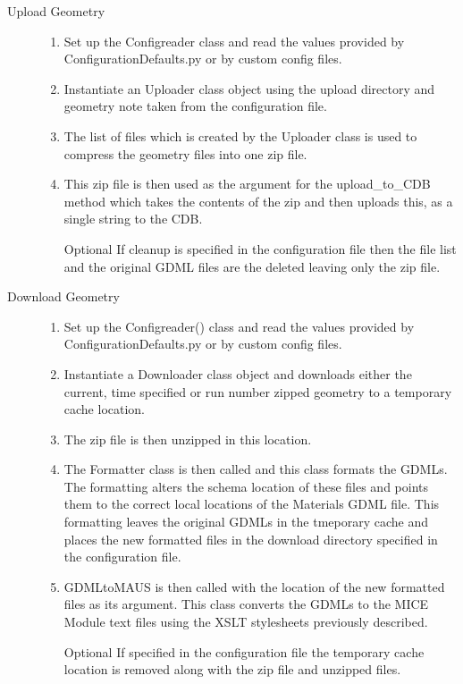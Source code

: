 \begin{description}
  \item[Upload Geometry] \hfill 
  \begin{enumerate}
   \item Set up the Configreader class and read the values provided by ConfigurationDefaults.py or by custom config files.
   \item Instantiate an Uploader class object using the upload directory and geometry note taken from the configuration file.
   \item The list of files which is created by the Uploader class is used to compress the geometry files into one zip file.
   \item This zip file is then used as the argument for the upload\_to\_CDB method which takes the contents of the zip and then uploads this, as a
single string to the CDB.
   \item[Optional] If cleanup is specified in the configuration file then the file list and the original GDML files are the deleted leaving only the
zip file.
  \end{enumerate}

  \item[Download Geometry] \hfill
  \begin{enumerate}
   \item Set up the Configreader() class and read the values provided by ConfigurationDefaults.py or by custom config files.
   \item Instantiate a Downloader class object and downloads either the current, time specified or run number zipped geometry to a temporary cache
location.
   \item The zip file is then unzipped in this location.
   \item The Formatter class is then called and this class formats the GDMLs. The formatting alters the schema location of these files and points
them to the correct local locations of the Materials GDML file. This formatting leaves the original GDMLs in the tmeporary cache and places the new
formatted files in the download directory specified in the configuration file.
   \item GDMLtoMAUS is then called with the location of the new formatted files as its argument. This class converts the GDMLs to the MICE Module
text files using the XSLT stylesheets previously described.
   \item[Optional] If specified in the configuration file the temporary cache location is removed along with the zip file and unzipped files.
  \end{enumerate}


\end{description}

